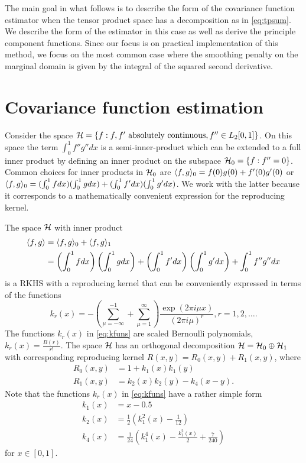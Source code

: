 The main goal in what follows is to describe the form of the covariance function estimator when the tensor product space has a decomposition as in \eqref{eq:tpsum}. We describe the form of the estimator in this case as well as derive the principle component functions. Since our focus is on practical implementation of this method, we focus on the most common case where the smoothing penalty on the marginal domain is given by the integral of the squared second derivative.

\section{Covariance function estimation} 

\label{sec:covariance_function_estimation}

Consider the space $\mathcal{H} = \{f : f, f' \mbox{ absolutely continuous}, f'' \in L_2[0,1]\}$. On this space the term $\int_0^1 f''g''dx$ is a semi-inner-product which can be extended to a full inner product by defining an inner product on the subspace $\mathcal{H}_0 = \{f : f'' = 0\}$. Common choices for inner products in $\mathcal{H}_0$ are $\langle f, g \rangle_0 = f(0)g(0) + f'(0)g'(0)$ or $\langle f, g \rangle_0 = (\int_0^1fdx)(\int_0^1gdx) + (\int_0^1f'dx)(\int_0^1g'dx)$. We work with the latter because it corresponds to a mathematically convenient expression for the reproducing kernel. 

The space $\mathcal{H}$ with inner product 
\begin{align}
	\langle f, g \rangle &= \langle f, g \rangle_0 + \langle f, g \rangle_1 \nonumber \\
	&= \left(\int_0^1fdx\right)\left(\int_0^1gdx\right) + \left(\int_0^1f'dx\right)\left(\int_0^1g'dx\right) + \int_0^1 f''g''dx 
	\label{inner prod}
\end{align}
is a RKHS with a reproducing kernel that can be conveniently expressed in terms of the functions 
\begin{equation}
	k_r(x) = -\left( \sum_{\mu = -\infty}^{-1} + \sum_{\mu=1}^{\infty} \right) \frac{\exp(2\pi i \mu x)}{(2 \pi i \mu)^r}, r = 1,2, \dots.\nonumber \label{eq:kfuns} 
\end{equation}
The functions $k_r(x)$ in \eqref{eq:kfuns} are scaled Bernoulli polynomials, $k_r(x) = \frac{B(r)}{r!}$. The space $\mathcal{H}$ has an orthogonal decomposition $\mathcal{H} = \mathcal{H}_0 \oplus \mathcal{H}_1$ with corresponding reproducing kernel $R(x,y) = R_0(x,y) + R_1(x,y)$, where 
\begin{align}
	R_0(x,y) &= 1 + k_1(x)k_1(y) \\
	R_1(x,y) &= k_2(x)k_2(y) - k_4(x-y). 
\end{align}
Note that the functions $k_r(x)$ in \eqref{eq:kfuns} have a rather simple form 
\begin{align*}
	k_1(x) &= x - 0.5\\
	k_2(x) &= \frac{1}{2}(k_1^2(x) - \frac{1}{12}) \\
	k_4(x) &= \frac{1}{24} \left(k_1^4(x) - \frac{k_1^2(x)}{2} + \frac{7}{240} \right) 
\end{align*}
for $x \in [0,1]$. 

